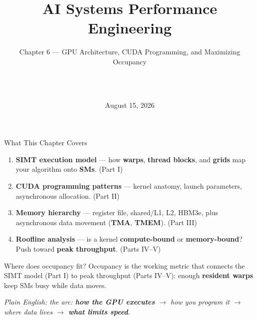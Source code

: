 \documentclass[aspectratio=169]{beamer}
\title[AI Systems Performance Engineering]{AI Systems Performance Engineering}
\subtitle{Chapter 6 --- GPU Architecture, CUDA Programming, and Maximizing Occupancy}
\author[\PresenterName\ \ \PresenterTitle\ \ \PresenterOrg]{\PresenterName\\\PresenterTitle\\\PresenterOrg}
\institute[]{\footnotesize Internal Training for Applied Scientists on AI Infrastructure}
\date{August 15, 2026}
\newcommand{\kw}[1]{\textbf{\textcolor{kwblue}{#1}}}
\newcommand{\pe}[1]{\par{\setlength{\fboxsep}{2.5pt}\noindent\colorbox{navy!9}{\parbox{\dimexpr\textwidth-5pt\relax}{\footnotesize\itshape Plain English: #1}}}}
\begin{document}
\begin{frame}
  \titlepage
\end{frame}

\begin{frame}{What This Chapter Covers}
  \begin{enumerate}
    \item \kw{SIMT execution model} --- how \kw{warps}, \kw{thread blocks}, and \kw{grids}
          map your algorithm onto \kw{SMs}. \hfill (Part I)
    \item \kw{CUDA programming patterns} --- kernel anatomy, launch parameters,
          asynchronous allocation. \hfill (Part II)
    \item \kw{Memory hierarchy} --- register file, shared/L1, L2, HBM3e, plus
          asynchronous data movement (\kw{TMA}, \kw{TMEM}). \hfill (Part III)
    \item \kw{Roofline analysis} --- is a kernel \kw{compute-bound} or \kw{memory-bound}?
          Push toward \kw{peak throughput}. \hfill (Parts IV--V)
  \end{enumerate}
  \medskip
  \begin{block}{Where does occupancy fit?}
    \small Occupancy is the working metric that connects the SIMT model (Part I) to peak
    throughput (Parts IV--V): enough \kw{resident warps} keep SMs busy while data moves.
  \end{block}
  \pe{the arc: \kw{how the GPU executes} $\to$ how you program it $\to$ where data lives $\to$ \kw{what limits speed}.}
\end{frame}
\end{document}
